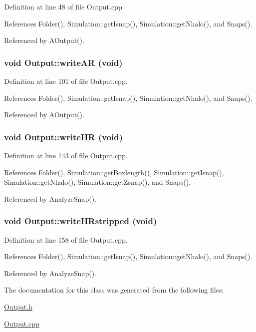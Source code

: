 Definition at line 48 of file Output.cpp.



References Folder(), Simulation::getIsnap(), Simulation::getNhalo(), and Snaps().



Referenced by AOutput().

\subsubsection[{writeAR}]{\setlength{\rightskip}{0pt plus 5cm}void Output::writeAR (void)}\label{classOutput_a4b6aca71978b0dcd4a40be86239d37f5}


Definition at line 101 of file Output.cpp.



References Folder(), Simulation::getIsnap(), Simulation::getNhalo(), and Snaps().



Referenced by AOutput().

\subsubsection[{writeHR}]{\setlength{\rightskip}{0pt plus 5cm}void Output::writeHR (void)}\label{classOutput_adbb20b34ba5579ab43ec53b242219a7d}


Definition at line 143 of file Output.cpp.



References Folder(), Simulation::getBoxlength(), Simulation::getIsnap(), Simulation::getNhalo(), Simulation::getZsnap(), and Snaps().



Referenced by AnalyzeSnap().

\subsubsection[{writeHRstripped}]{\setlength{\rightskip}{0pt plus 5cm}void Output::writeHRstripped (void)}\label{classOutput_abcbbba75272c18b1bb8e50de77d17dd6}


Definition at line 158 of file Output.cpp.



References Folder(), Simulation::getIsnap(), Simulation::getNhalo(), and Snaps().



Referenced by AnalyzeSnap().



The documentation for this class was generated from the following files:\begin{DoxyCompactItemize}
\item 
\hyperlink{Output_8h}{Output.h}\item 
\hyperlink{Output_8cpp}{Output.cpp}\end{DoxyCompactItemize}

